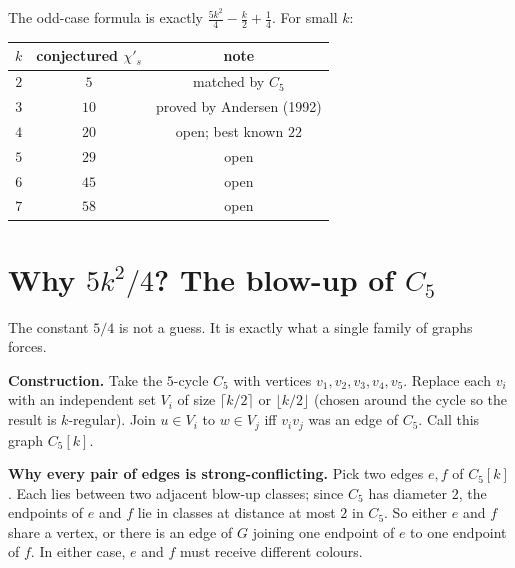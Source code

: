 \documentclass[11pt]{article}
\newcommand{\sci}{\chi'_s}
\begin{document}
The odd-case formula is exactly $\frac{5k^2}{4} - \frac{k}{2} +
\frac{1}{4}$. For small $k$:
\begin{center}
\begin{tabular}{c|c|c}
$k$ & conjectured $\sci$ & note \\
\hline
$2$ & $5$  & matched by $C_5$ \\
$3$ & $10$ & proved by Andersen (1992) \\
$4$ & $20$ & open; best known $22$ \\
$5$ & $29$ & open \\
$6$ & $45$ & open \\
$7$ & $58$ & open \\
\end{tabular}
\end{center}

\section*{Why $5k^2/4$? The blow-up of $C_5$}

The constant $5/4$ is not a guess. It is exactly what a single
family of graphs forces.

\textbf{Construction.} Take the $5$-cycle $C_5$ with vertices
$v_1, v_2, v_3, v_4, v_5$. Replace each $v_i$ with an independent set
$V_i$ of size $\lceil k/2 \rceil$ or $\lfloor k/2 \rfloor$ (chosen
around the cycle so the result is $k$-regular). Join $u \in V_i$ to
$w \in V_j$ iff $v_i v_j$ was an edge of $C_5$. Call this graph
$C_5[k]$.

\begin{center}
\end{center}

\textbf{Why every pair of edges is strong-conflicting.}
Pick two edges $e, f$ of $C_5[k]$. Each lies between two adjacent
blow-up classes; since $C_5$ has diameter $2$, the endpoints of $e$
and $f$ lie in classes at distance at most $2$ in $C_5$. So either $e$
and $f$ share a vertex, or there is an edge of $G$ joining one
endpoint of $e$ to one endpoint of $f$. In either case, $e$ and $f$
must receive different colours.
\end{document}
